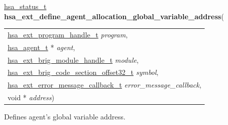 \documentclass[final]{book}
\newcommand{\hsaarg}[1]{\textit{#1}}
\begin{document}
\noindent\begin{tcolorbox}[breakable,nobeforeafter,colframe=white,colback=lightgray,left=0mm]
\hyperlink{group__status_1gad755322e7ff95456520e8abdbe90d225}{hsa_status_t} \hypertarget{group__HsailLinkerServiceLayer_1ga355f1b1bdeb9a58732956779ed352e71}{\textbf{hsa_ext_define_agent_allocation_global_variable_address}}(
\vspace{-3.5mm}\begin{longtable}{@{}p{\textwidth}}
\hspace{1.7em}\hyperlink{group__HsailLinkerServiceLayer_1gaea8d90863414407ddba7e318db7412f9}{hsa_ext_program_handle_t} \hsaarg{program},\\
\hspace{1.7em}\hyperlink{group__topology_1gab8db3fb886332a24acac08ec361e1d86}{hsa_agent_t} * \hsaarg{agent},\\
\hspace{1.7em}\hyperlink{group__FinalizerCoreApi_1ga0216996f5341a8591ecf9e0f6fd1b7e5}{hsa_ext_brig_module_handle_t} \hsaarg{module},\\
\hspace{1.7em}\hyperlink{group__FinalizerCoreApi_1ga494b8ac14a8c10af95b83b51a8a4ad7f}{hsa_ext_brig_code_section_offset32_t} \hsaarg{symbol},\\
\hspace{1.7em}\hyperlink{group__FinalizerCoreApi_1gace3d3971c5289675c4f88ce0045db41f}{hsa_ext_error_message_callback_t} \hsaarg{error_message_callback},\\
\hspace{1.7em}void * \hsaarg{address})\end{longtable}

\end{tcolorbox}
Defines agent's global variable address.
\end{document}
